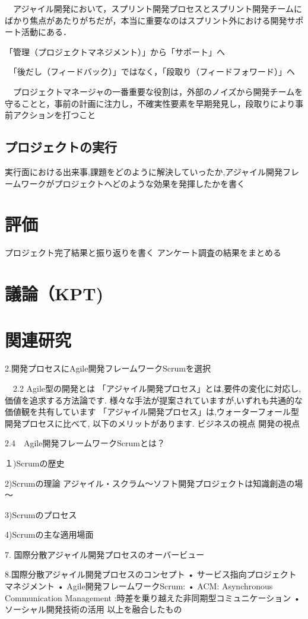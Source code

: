 \documentclass[paper]{jrsj}
\begin{document}
　アジャイル開発において，スプリント開発プロセスとスプリント開発チームにばかり焦点があたりがちだが，本当に重要なのはスプリント外における開発サポート活動にある．
 
「管理（プロジェクトマネジメント）」から「サポート」へ
 
　「後だし（フィードバック）」ではなく，「段取り（フィードフォワード）」へ
 
　プロジェクトマネージャの一番重要な役割は，外部のノイズから開発チームを守ることと，事前の計画に注力し，不確実性要素を早期発見し，段取りにより事前アクションを打つこと

\subsection{プロジェクトの実行}
 実行面における出来事,課題をどのように解決していったか,アジャイル開発フレームワークがプロジェクトへどのような効果を発揮したかを書く
\section{評価}
 プロジェクト完了結果と振り返りを書く
アンケート調査の結果をまとめる

\section{議論（KPT)}
 
\section{関連研究}

 
2.開発プロセスにAgile開発フレームワークScrumを選択

　2.2 Agile型の開発とは 
「アジャイル開発プロセス」とは,要件の変化に対応し,価値を追求する方法論です.
様々な手法が提案されていますが,いずれも共通的な価値観を共有しています
「アジャイル開発プロセス」は,ウォーターフォール型開発プロセスに比べて,
以下のメリットがあります.
ビジネスの視点
開発の視点

2.4　Agile開発フレームワークScrumとは？

１)Scrumの歴史

2)Scrumの理論
アジャイル・スクラム～ソフト開発プロジェクトは知識創造の場～

3)Scrumのプロセス

4)Scrumの主な適用場面


7. 国際分散アジャイル開発プロセスのオーバービュー


8.国際分散アジャイル開発プロセスのコンセプト
•	サービス指向プロジェクトマネジメント
•	Agile開発フレームワークScrum: 
•	ACM: Asynchronous Communication Management :時差を乗り越えた非同期型コミュニケーション
•	ソーシャル開発技術の活用
以上を融合したもの
\end{document}
